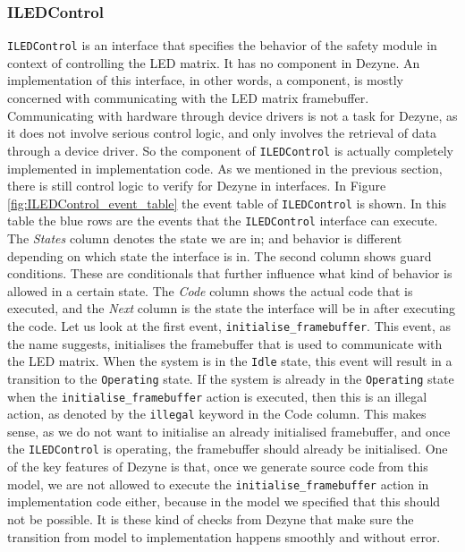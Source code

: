 \documentclass[12pt]{scrreprt}
\begin{document}
\subsubsection{ILEDControl}
\texttt{ILEDControl} is an interface that specifies the behavior of the safety module in context of controlling the LED matrix. It has no component in Dezyne. An implementation of this interface, in other words, a component, is mostly concerned with communicating with the LED matrix framebuffer. Communicating with hardware through device drivers is not a task for Dezyne, as it does not involve serious control logic, and only involves the retrieval of data through a device driver. So the component of \texttt{ILEDControl} is actually completely implemented in implementation code. As we mentioned in the previous section, there is still control logic to verify for Dezyne in interfaces. In Figure \ref{fig:ILEDControl_event_table} the event table of \texttt{ILEDControl} is shown. In this table the blue rows are the events that the \texttt{ILEDControl} interface can execute. The \textit{States} column denotes the state we are in; and behavior is different depending on which state the interface is in. The second column shows guard conditions. These are conditionals that further influence what kind of behavior is allowed in a certain state. The \textit{Code} column shows the actual code that is executed, and the \textit{Next} column is the state the interface will be in after executing the code. Let us look at the first event, \texttt{initialise\_framebuffer}. This event, as the name suggests, initialises the framebuffer that is used to communicate with the LED matrix. When the system is in the \texttt{Idle} state, this event will result in a transition to the \texttt{Operating} state. If the system is already in the \texttt{Operating} state when the \texttt{initialise\_framebuffer} action is executed, then this is an illegal action, as denoted by the \texttt{illegal} keyword in the Code column. This makes sense, as we do not want to initialise an already initialised framebuffer, and once the \texttt{ILEDControl} is operating, the framebuffer should already be initialised. One of the key features of Dezyne is that, once we generate source code from this model, we are not allowed to execute the \texttt{initialise\_framebuffer} action in implementation code either, because in the model we specified that this should not be possible. It is these kind of checks from Dezyne that make sure the transition from model to implementation happens smoothly and without error. \par
\end{document}

